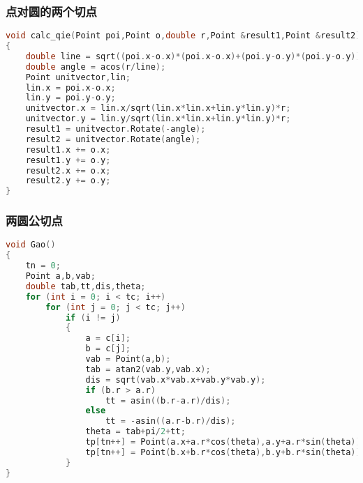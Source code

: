 	\subsubsection{点对圆的两个切点}
	\begin{lstlisting}[language=c++]
void calc_qie(Point poi,Point o,double r,Point &result1,Point &result2)
{
	double line = sqrt((poi.x-o.x)*(poi.x-o.x)+(poi.y-o.y)*(poi.y-o.y));
	double angle = acos(r/line);
	Point unitvector,lin;
	lin.x = poi.x-o.x;
	lin.y = poi.y-o.y;
	unitvector.x = lin.x/sqrt(lin.x*lin.x+lin.y*lin.y)*r;
	unitvector.y = lin.y/sqrt(lin.x*lin.x+lin.y*lin.y)*r;
	result1 = unitvector.Rotate(-angle);
	result2 = unitvector.Rotate(angle);
	result1.x += o.x;
	result1.y += o.y;
	result2.x += o.x;
	result2.y += o.y;
}
	\end{lstlisting}
	
	\subsubsection{两圆公切点}
	\begin{lstlisting}[language=c++]
void Gao()
{
	tn = 0;
	Point a,b,vab;
	double tab,tt,dis,theta;
	for (int i = 0; i < tc; i++)
		for (int j = 0; j < tc; j++)
			if (i != j)
			{
				a = c[i];
				b = c[j];
				vab = Point(a,b);
				tab = atan2(vab.y,vab.x);
				dis = sqrt(vab.x*vab.x+vab.y*vab.y);
				if (b.r > a.r)
					tt = asin((b.r-a.r)/dis);
				else
					tt = -asin((a.r-b.r)/dis);
				theta = tab+pi/2+tt;
				tp[tn++] = Point(a.x+a.r*cos(theta),a.y+a.r*sin(theta));
				tp[tn++] = Point(b.x+b.r*cos(theta),b.y+b.r*sin(theta));
			}
}
	\end{lstlisting}